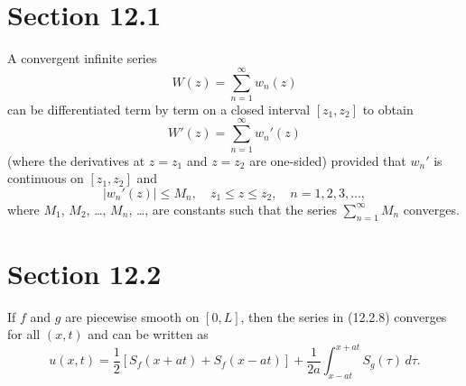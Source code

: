\section*{Section 12.1}
{}
\setcounter{chapter}{12}
\setcounter{section}{1}

\setcounter{theorem}{1}
\begin{theorem}
  \label{thmtype:12.1.2} A convergent infinite series
  \[
    W(z)=\sum_{n=1}^{\infty}w_{n}(z)
  \]
  can be differentiated term by term on a closed interval $[z_{1},z_{2}]$ to obtain
  \[
    W'(z)=\sum_{n=1}^{\infty}w_{n}'(z)
  \]
  (where the derivatives at $z=z_{1}$ and $z=z_{2}$ are one-sided) provided that $w_{n}'$ is
  continuous on $[z_{1},z_{2}]$ and
  \[
    |w_{n}'(z)|\le M_{n},\quad z_{1}\le z\le z_{2},\quad n=1,2,3,\dots,
  \]
  where $M_{1}$, $M_{2}$, \dots, $M_{n}$, \dots, are constants such that the series
  $\sum_{n=1}^{\infty}M_{n}$ converges.
\end{theorem}

\section*{Section 12.2}
\setcounter{chapter}{12}
\setcounter{section}{2}

\setcounter{theorem}{1}
\setcounter{equation}{8}
\begin{theorem}
  \label{thmtype:12.2.2} If $f$ and $g$ are piecewise smooth on $[0,L]$, then the series in
  \textup{(12.2.8)} converges for all $(x,t)$ and can be written as
  \begin{equation}
    \label{eq:12.2.9}u(x,t)=\frac{1}{2}[S_{f}(x+at)+S_{f}(x-at)]+ \frac{1}{2a}\int_{x-at}^{x+at}S_{g}(\tau)\,d\tau.
  \end{equation}
\end{theorem}


